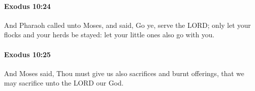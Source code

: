 		\paragraph{Exodus 10:24} %
			\label{EXODUS-10-24}

			And Pharaoh called unto Moses, and said, Go ye, serve the LORD; only let your flocks and your herds be stayed: let your little ones also go with you.


		\paragraph{Exodus 10:25} %
			\label{EXODUS-10-25}

			And Moses said, Thou must give us also sacrifices and burnt offerings, that we may sacrifice unto the LORD our God.


